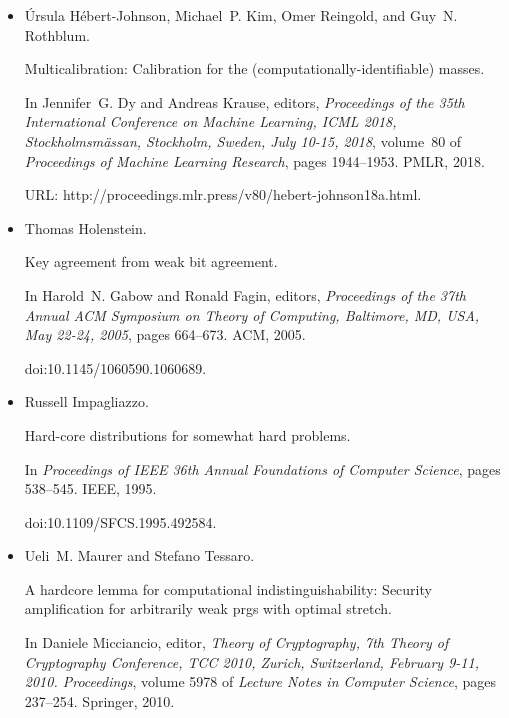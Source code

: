 \documentclass[10pt,a4paper]{article}
\begin{document}
\begin{itemize}
\item[] 
[10]

Úrsula Hébert-Johnson, Michael P. Kim, Omer Reingold, and Guy N.
Rothblum.


Multicalibration: Calibration for the (computationally-identifiable)
masses.


In Jennifer G. Dy and Andreas Krause, editors, \emph{Proceedings of
the 35th International Conference on Machine Learning, ICML 2018,
Stockholmsmässan, Stockholm, Sweden, July 10-15, 2018}, volume 80 of
\emph{Proceedings of Machine Learning Research}, pages 1944–1953. PMLR,
2018.


URL: http://proceedings.mlr.press/v80/hebert-johnson18a.html.





\item[] 
[11]

Thomas Holenstein.


Key agreement from weak bit agreement.


In Harold N. Gabow and Ronald Fagin, editors, \emph{Proceedings of the
37th Annual ACM Symposium on Theory of Computing, Baltimore, MD, USA, May
22-24, 2005}, pages 664–673. ACM, 2005.


doi:10.1145/1060590.1060689.





\item[] 
[12]

Russell Impagliazzo.


Hard-core distributions for somewhat hard problems.


In \emph{Proceedings of IEEE 36th Annual Foundations of Computer
Science}, pages 538–545. IEEE, 1995.


doi:10.1109/SFCS.1995.492584.





\item[] 
[13]

Ueli M. Maurer and Stefano Tessaro.


A hardcore lemma for computational indistinguishability: Security
amplification for arbitrarily weak prgs with optimal stretch.


In Daniele Micciancio, editor, \emph{Theory of Cryptography, 7th
Theory of Cryptography Conference, TCC 2010, Zurich, Switzerland, February
9-11, 2010. Proceedings}, volume 5978 of \emph{Lecture Notes in Computer
Science}, pages 237–254. Springer, 2010.



\end{itemize}
\end{document}
